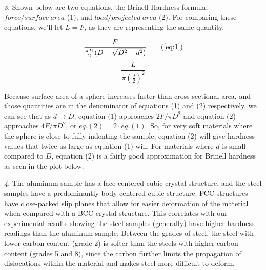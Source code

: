 \documentclass{article}
\begin{document}
\vspace{1em}
\textit{3}. Shown below are two equations, the Brinell Hardness formula, $force/surface\:area$ (1), and $load/projected\:area$ (2). For comparing these equations, we'll let $L = F$, as they are representing the same quantity.
\begin{center}
	\begin{multicols}{2}
		\begin{equation}
		\frac{F}{\frac{\pi D}{2}(D-\sqrt{D^2-d^2})} \tag{\ref{eq:1}}
		\end{equation}\break
		\begin{equation}
		\frac{L}{\pi(\frac{d}{2})^2}
		\end{equation}
	\end{multicols}
\end{center}
\vspace{1em}
Because surface area of a sphere increases faster than cross sectional area, and those quantities are in the denominator of equations (1) and (2) respectively, we can see that as $d \rightarrow D$, equation (1) approaches $2F/\pi D^2$ and equation (2) approaches $4F/\pi D^2$, or $eq.(2) = 2\cdot eq.(1)$. So, for very soft materials where the sphere is close to fully indenting the sample, equation (2) will give hardness values that twice as large as equation (1) will. For materials where $d$ is small compared to $D$, equation (2) is a fairly good approximation for Brinell hardness as seen in the plot below.
\vspace{2em}
\begin{center}
\end{center}

\textit{4}. 
The aluminum sample has a face-centered-cubic crystal structure, and the steel samples have a predominantly body-centered-cubic structure. FCC structures have close-packed slip planes that allow for easier deformation of the material when compared with a BCC crystal structure. This correlates with our experimental results showing the steel samples (generally) have higher hardness readings than the aluminum sample. Between the grades of steel, the steel with lower carbon content (grade 2) is softer than the steels with higher carbon content (grades 5 and 8), since the carbon further limits the propagation of dislocations within the material and makes steel more difficult to deform.
\end{document}
